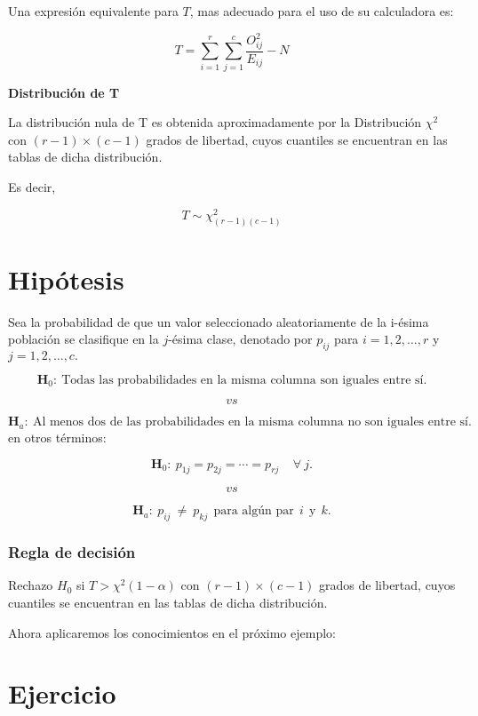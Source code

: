 \documentclass[
  a4paper,
  oneside,
  openany]{book}
\begin{document}
Una expresión equivalente para \(T\), mas adecuado para el uso de su calculadora es:

\[T=\sum_{i=1}^{r}\sum_{j=1}^{c}\frac{O_{ij}^{2}}{E_{ij}}-N\]

\textbf{Distribución de T}

La distribución nula de T es obtenida aproximadamente por la Distribución \(\chi^2\) con \((r-1)\times(c-1)\) grados de libertad, cuyos cuantiles se encuentran en las tablas de dicha distribución.

Es decir,

\[T\sim \chi^2_{(r-1)(c-1)}\]

\hypertarget{hipuxf3tesis-11}{%
\section{Hipótesis}\label{hipuxf3tesis-11}}

Sea la probabilidad de que un valor seleccionado aleatoriamente de la i-ésima población se clasifique en la \(j\)-ésima clase, denotado por \(p_{ij}\) para \(i= 1, 2,\ldots,r\) y \(j=1,2,\ldots,c.\)

\[\textbf{H}_0: \ \mbox{Todas las probabilidades en la misma columna son iguales entre sí.}\]

\[vs\]

\[\textbf{H}_a: \ \mbox{Al menos dos de las probabilidades en la misma columna no son iguales entre sí.}\]
en otros términos:

\[\textbf{H}_0: \ p_{1j}=p_{2j}= \cdots=p_{rj} \ \ \ \ \  \forall\  j.\]

\[vs\]

\[\textbf{H}_a: \ p_{ij} \ \neq \  p_{kj} \ \ \mbox{para algún par} \ \  i \ \ \mbox{y} \ \ k.\]

\hypertarget{regla-de-decisiuxf3n-25}{%
\subsubsection*{Regla de decisión}\label{regla-de-decisiuxf3n-25}}


Rechazo \(H_0\) si \(T> \chi^2(1-\alpha)\) con \((r-1)\times(c-1)\) grados de libertad, cuyos cuantiles se encuentran en las tablas de dicha distribución.

Ahora aplicaremos los conocimientos en el próximo ejemplo:

\hypertarget{ejercicio-1}{%
\section{Ejercicio}\label{ejercicio-1}}
\end{document}
